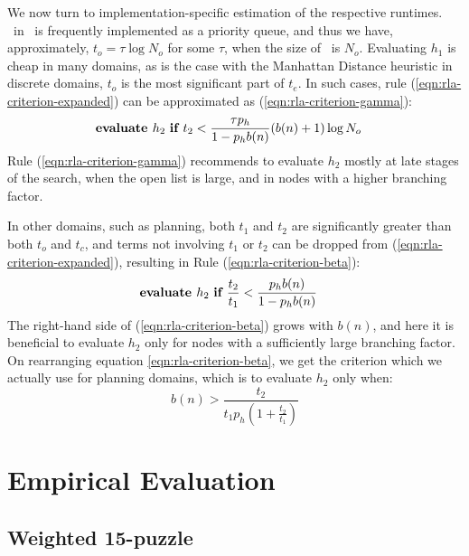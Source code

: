 We now turn to implementation-specific estimation of the respective runtimes.
\OPEN~in  \astar~is frequently implemented as a priority queue, and thus we have, approximately,
$t_o=\tau \log N_o$ for some $\tau$, when the size of \OPEN~is $N_o$.
Evaluating $h_1$ is cheap in many domains, as is the
case with the Manhattan Distance heuristic in discrete domains, $t_o$ is the most significant part of
$t_{e}$. In such cases,
rule (\ref{eqn:rla-criterion-expanded}) can be approximated as (\ref{eqn:rla-criterion-gamma}):
\begin{align}
  &\mbox{\bf evaluate }h_2\mbox{ \bf if } t_2 < \frac {\tau p_h} {1-p_hb(n)} (b(n)+1)\log N_o
\label{eqn:rla-criterion-gamma}
\end{align}
Rule (\ref{eqn:rla-criterion-gamma})
recommends to evaluate $h_2$ mostly at late stages of the search,
when the open list is large, and in nodes with a higher branching factor.

In other domains, such as planning, both $t_1$ and $t_2$ are
significantly greater than both $t_o$ and $t_c$, and terms
not involving $t_1$ or $t_2$ can be dropped from
(\ref{eqn:rla-criterion-expanded}), resulting in Rule (\ref{eqn:rla-criterion-beta}):
\begin{align}
  &\mbox{\bf evaluate }h_2\mbox{ \bf if } \frac{t_2}{t_1} < \frac {p_hb(n)} {1-p_hb(n)}
\label{eqn:rla-criterion-beta}
\end{align}
The right-hand side of (\ref{eqn:rla-criterion-beta}) grows with $b(n)$, and here it is beneficial to evaluate $h_2$
only for nodes with a sufficiently large branching factor. On rearranging equation \ref{eqn:rla-criterion-beta},
we get the criterion which we actually use for planning domains,
which is to evaluate $h_2$ only when:
\begin{equation}
b(n) > \frac{t_2}{t_1 p_h \left(1 + \frac{t_2}{t_1}\right)}
\label{eqn:rla-planning-rule}
\end{equation}

\section{Empirical Evaluation}
\label{sec:rla-empirical}

\subsection{Weighted 15-puzzle}

